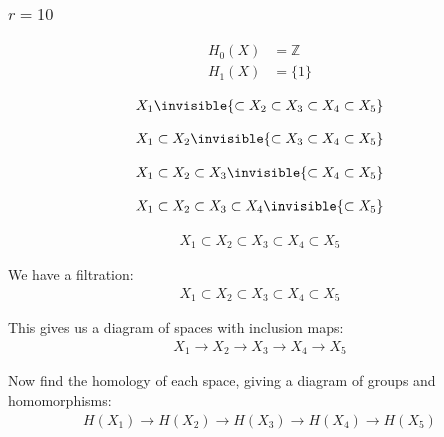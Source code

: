 \documentclass[11pt]{beamer}
\begin{document}
\begin{frame}
\frametitle{$r=10$}
\begin{align*}
  H_0(X) &= \mathbb{Z} \\
  H_1(X) &= \{1\}
\end{align*}
\end{frame}

\begin{frame}
\begin{align*}
X_{1} \invisible{\subset X_{2} \subset X_{3} \subset X_{4} \subset X_{5}}
\end{align*}
\end{frame}
\begin{frame}
\begin{align*}
X_{1} \subset X_{2} \invisible{\subset X_{3} \subset X_{4} \subset X_{5}}
\end{align*}
\end{frame}
\begin{frame}
\begin{align*}
X_{1} \subset X_{2} \subset X_{3} \invisible{\subset X_{4} \subset X_{5}}
\end{align*}
\end{frame}
\begin{frame}
\begin{align*}
X_{1} \subset X_{2} \subset X_{3} \subset X_{4} \invisible{\subset X_{5}}
\end{align*}
\end{frame}
\begin{frame}
\begin{align*}
X_{1} \subset X_{2} \subset X_{3} \subset X_{4} \subset X_{5}
\end{align*}
\end{frame}

\begin{frame}
We have a filtration:
\begin{align*}
X_{1} \subset X_{2} \subset X_{3} \subset X_{4} \subset X_{5}
\end{align*}

This gives us a diagram of spaces with inclusion maps:
\begin{align*}
X_{1} \to X_{2} \to X_{3} \to X_{4} \to X_{5}
\end{align*}

Now find the homology of each space, giving a diagram of groups and homomorphisms:
\begin{align*}
H(X_{1}) \to H(X_{2}) \to H(X_{3}) \to H(X_{4}) \to H(X_{5})
\end{align*}
\end{frame}
\end{document}
